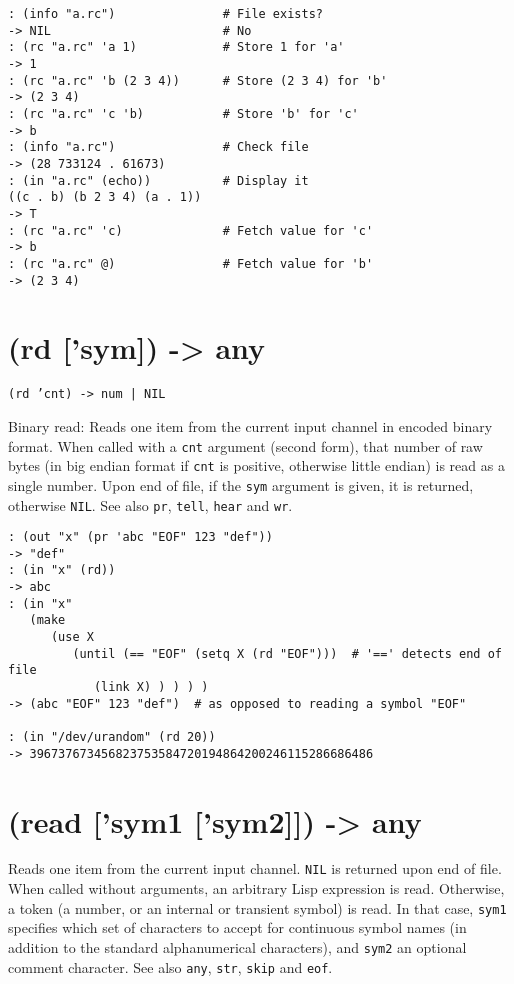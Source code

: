 {{{{{{{{\begin{verbatim}
: (info "a.rc")               # File exists?
-> NIL                        # No
: (rc "a.rc" 'a 1)            # Store 1 for 'a'
-> 1
: (rc "a.rc" 'b (2 3 4))      # Store (2 3 4) for 'b'
-> (2 3 4)
: (rc "a.rc" 'c 'b)           # Store 'b' for 'c'
-> b
: (info "a.rc")               # Check file
-> (28 733124 . 61673)
: (in "a.rc" (echo))          # Display it
((c . b) (b 2 3 4) (a . 1))
-> T
: (rc "a.rc" 'c)              # Fetch value for 'c'
-> b
: (rc "a.rc" @)               # Fetch value for 'b'
-> (2 3 4)
\end{verbatim}

 
\section{(rd ['sym]) -> any}
\label{sec-8-1-18-11}


\texttt{(rd 'cnt) -> num | NIL}

Binary read: Reads one item from the current input channel in encoded
binary format. When called with a \texttt{cnt} argument (second form), that
number of raw bytes (in big endian format if \texttt{cnt} is positive,
otherwise little endian) is read as a single number. Upon end of file,
if the \texttt{sym} argument is given, it is returned, otherwise \texttt{NIL}. See
also \texttt{pr}, \texttt{tell}, \texttt{hear} and \texttt{wr}.


\begin{verbatim}
: (out "x" (pr 'abc "EOF" 123 "def"))
-> "def"
: (in "x" (rd))
-> abc
: (in "x"
   (make
      (use X
         (until (== "EOF" (setq X (rd "EOF")))  # '==' detects end of file
            (link X) ) ) ) )
-> (abc "EOF" 123 "def")  # as opposed to reading a symbol "EOF"

: (in "/dev/urandom" (rd 20))
-> 396737673456823753584720194864200246115286686486
\end{verbatim}

 
\section{(read ['sym1 ['sym2]]) -> any}
\label{sec-8-1-18-12}


Reads one item from the current input channel. \texttt{NIL} is returned upon
end of file. When called without arguments, an arbitrary Lisp expression
is read. Otherwise, a token (a number, or an internal or transient
symbol) is read. In that case, \texttt{sym1} specifies which set of characters
to accept for continuous symbol names (in addition to the standard
alphanumerical characters), and \texttt{sym2} an optional comment character.
See also \texttt{any}, \texttt{str}, \texttt{skip} and \texttt{eof}.


}}}}}}}}
